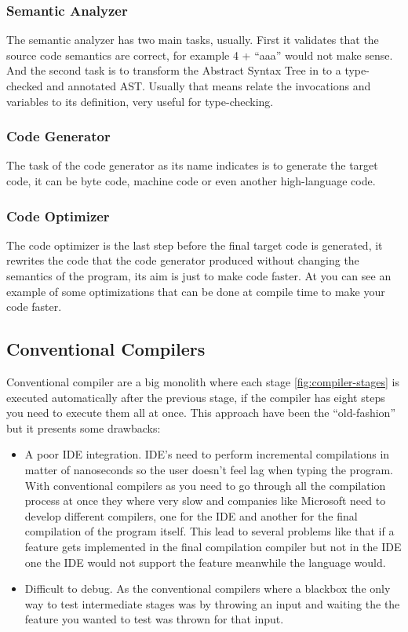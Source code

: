 \subsubsection{Semantic Analyzer}
The semantic analyzer has two main tasks, usually. First it validates that the source code semantics are correct, for
example 4 + “aaa” would not make sense. And the second task is to transform the Abstract Syntax Tree in to a type-checked
and annotated AST. Usually that means relate the invocations and variables to its definition, very useful for type-checking.

\subsubsection{Code Generator}
The task of the code generator as its name indicates is to generate the target code, it can be byte code, machine code
or even another high-language code.

\subsubsection{Code Optimizer}
The code optimizer is the last step before the final target code is generated, it rewrites the code that the code generator
produced without changing the semantics of the program, its aim is just to make code faster. At \cite{compiler-optimizations}
you can see an example of some optimizations that can be done at compile time to make your code faster.

\subsection{Conventional Compilers}
Conventional compiler are a big monolith where each stage \ref{fig:compiler-stages} is executed automatically after the
previous stage, if the compiler has eight steps you need to execute them all at once. This approach have been the “old-fashion”
but it presents some drawbacks:
\begin{itemize}
    \item A poor IDE \cite{ide} integration. IDE’s need to perform incremental compilations in matter of nanoseconds so
    the user doesn’t feel lag when typing the program. With conventional compilers as you need to go through all the compilation
    process at once they where very slow and companies like Microsoft need to develop different compilers, one for the IDE and
    another for the final compilation of the program itself. This lead to several problems like that if a feature gets
    implemented in the final compilation compiler but not in the IDE one the IDE would not support the feature meanwhile
    the language would.
    \item Difficult to debug. As the conventional compilers where a blackbox the only way to test intermediate stages was
    by throwing an input and waiting the the feature you wanted to test was thrown for that input.
\end{itemize}

